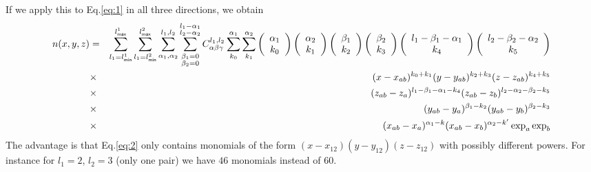 \documentclass[prb]{revtex4}
\begin{document}
If we apply this to Eq.\ref{eq:1} in all three directions, we obtain
\begin{eqnarray}
  \label{eq:2}
  n(x,y,z)  &=&
            \sum_{l_1 = l_{\sf min}^1}^{l_{\sf max}^1} \sum_{l_1 = l_{\sf min}^2}^{l_{\sf max}^2} \sum_{\alpha_1,\alpha_2}^{l_1,l_2} \sum_{\substack{\beta_1 = 0\\\beta_2 = 0}} ^{\substack{l_1 - \alpha_1\\l_2 - \alpha_2}}  C^{l_1,l_2}_{\alpha\beta\gamma} \sum_{k_0} ^ {\alpha_1}\sum_{k_1} ^ {\alpha_2} \left(
            \begin{array}{c}
              {\alpha_1}\\
              k_0\end{array}
              \right)
              \left(
              \begin{array}{c}
                \alpha_2\\
                k_1
              \end{array}\right)
              \left(\begin{array}{c}
                \beta_1\\
                k_2\end{array}
                \right)
                \left(
                \begin{array}{c}
                  \beta_2\\
                  k_3
                \end{array}\right)
                \left(\begin{array}{c}
                  l_1 - \beta_1 - \alpha_1\\
                  k_4\end{array}
                  \right)
                  \left(
                  \begin{array}{c}
                    l_2 - \beta_2 - \alpha_2\\
                    k_5
                  \end{array}\right)\nonumber\\ &\times&
                  (x-x_{ab})^{k_0+k_1} (y-y_{ab})^{k_2+k_3} (z - z_{ab}) ^ {k_4 + k_5}\nonumber\\ &\times& (z_{ab} - z_a) ^{l_1 - \beta_1 - \alpha_1 - k_4} (z_{ab} - z_b)^{l_2 - \alpha_2 - \beta_2-k_5}\nonumber  \\ &\times& (y_{ab} - y_a) ^{\beta_1 - k_2} (y_{ab} - y_b)^{\beta_2-k_3}\nonumber \\ &\times& (x_{ab}-x_a)^{\alpha_1 - k} (x_{ab}-x_b)^{\alpha_2 - k'} \exp_a\exp_b
\end{eqnarray}
The advantage is that Eq.\ref{eq:2} only contains monomials of the form
$(x-x_{12}) (y-y_{12}) (z-z_{12})$ with possibly different powers. For instance
for $l_1 = 2$, $l_2 = 3$ (only one pair) we have $46$ monomials instead of $60$.
\end{document}
